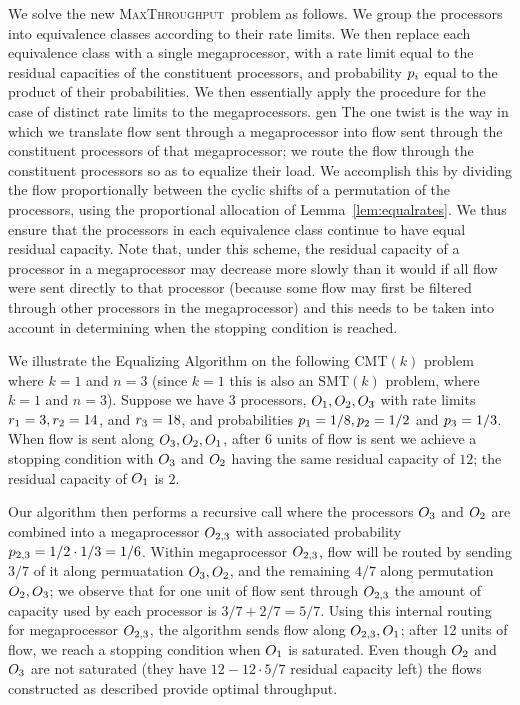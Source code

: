 \documentclass{article}
\newcounter{ass}
\newcommand{\ens}[1]{\ensuremath{#1}}					\newcommand{\card}[1]{\ens{|#1|}}							\newcommand{\dotlist}[2]{\ens{#1,\ldots,#2}}
\newcommand{\valk}{\ens{k}}
\newcommand{\maxthru}{\textsc{MaxThroughput}}
\newcommand{\processor}{processor}
\newcommand{\megaprocessor}{mega\processor}
\newcommand{\smt}{\textsf{SMT}$(\valk)$ problem}				\newcommand{\cmt}{\textsf{CMT}$(\valk)$ problem}
\begin{document}
We solve the new \maxthru\ problem as follows.
We group the {\processor}s into equivalence
classes according to their rate limits.
We then replace each equivalence class with a single
{\megaprocessor}, with a rate limit equal to the
residual capacities of the constituent {\processor}s, and probability $\pr i$ equal
to the product of their probabilities.
We then essentially apply the procedure for
the case of distinct rate limits to the {\megaprocessor}s.
gen
The one twist is the way in which we
translate flow sent through a {\megaprocessor}
into flow sent through the constituent {\processor}s of
that {\megaprocessor};
we route the flow through
the constituent {\processor}s so as to equalize their load.
We accomplish this by dividing the flow
proportionally between the cyclic shifts of a permutation of the {\processor}s,
using the proportional allocation of Lemma~\ref{lem:equalrates}.
We thus ensure that the {\processor}s in each equivalence class
continue to have equal residual capacity.  
Note that, under this scheme, the residual capacity
of a {\processor} in a {\megaprocessor} may decrease more slowly
than it would if all flow were sent directly to that {\processor}
(because some flow may first be filtered through other {\processor}s
in the {\megaprocessor})
and this needs to be taken into account in determining when
the stopping condition is reached.

We illustrate the
Equalizing Algorithm on the following
\cmt{} where $k=1$ and $n=3$
(since $k=1$ this is also an \smt{}, where $k=1$ and $n=3$).
Suppose we have 3 {\processor}s, $\op{1},\op{2},\op{3}$ 
with rate limits $\rate 1 = 3, \rate 2 = 14$, and $\rate 3 = 18$, and
probabilities $\pr 1 = 1/8,\pr{2} = 1/2$ and $\pr{3} = 1/3$.
When flow is sent along  $\op{3},\op{2},\op{1}$, after 6 units of flow is sent we achieve a stopping condition with $\op{3}$ and $\op{2}$ having the same residual capacity of $12$; the residual capacity of $\op{1}$ is $2$.

Our algorithm then performs a recursive call where the {\processor}s $\op{3}$ and $\op{2}$ are combined into a {\megaprocessor} $\op{2,3}$ with 
associated probability
$\pr{2,3}=1/2\cdot 1/3=1/6$.  Within 
{\megaprocessor} $\op{2,3}$, flow will be routed by sending $3/7$ of it along
permuatation $\op{3},\op{2}$, and the remaining $4/7$ along
permutation $\op{2},\op{3}$; we observe that for one unit of flow sent through $\op{2,3}$ the amount of capacity used by each {\processor} is $3/7 + 2/7=5/7$.
Using this internal routing for {\megaprocessor} $\op{2,3}$,
the algorithm sends flow along $\op{2,3},\op{1}$; after 12 units of flow, we reach a stopping condition when $\op{1}$ is saturated.  Even though $\op{2}$ and $\op{3}$ are not saturated (they have $12-12\cdot 5/7$ residual capacity left) the flows constructed as described provide optimal throughput.
\end{document}
